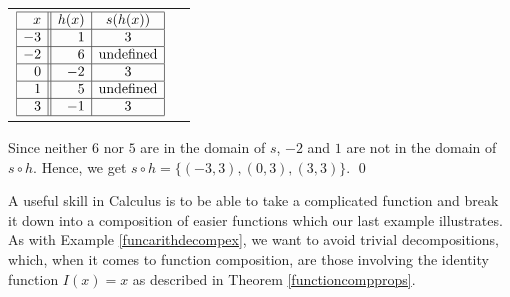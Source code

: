 \documentclass{ximera}
\begin{document}
\begin{example}
\begin{enumerate}
\begin{center}
\begin{tabular}{m{2.5in}m{2.5in}}
$ \begin{array}{|r||r|c|}  \hline

x & h(x) & s(h(x)) \\ \hline

-3 & 1 & 3 \\ \hline

-2 & 6 &  \text{undefined} \\ \hline

0 & -2 & 3 \\ \hline

1 & 5 & \text{undefined} \\ \hline

3 & -1 & 3 \\  \hline


  \end{array} $
  
\\ 

\end{tabular}  
  
  \end{center}
  
Since neither $6$ nor $5$ are in the domain of $s$, $-2$ and $1$ are not in the domain of $s \circ h$.  Hence, we get $s \circ h = \{ (-3,3), (0,3), (3,3) \}$. \qed


\end{enumerate}

\end{example}



A useful skill in Calculus is to be able to take a complicated function and break it down into a composition of easier functions which our last example illustrates. As with Example \ref{funcarithdecompex}, we want to avoid trivial decompositions, which, when it comes to function composition, are those involving the identity function $I(x) = x$ as described in Theorem \ref{functioncompprops}.
\end{document}
